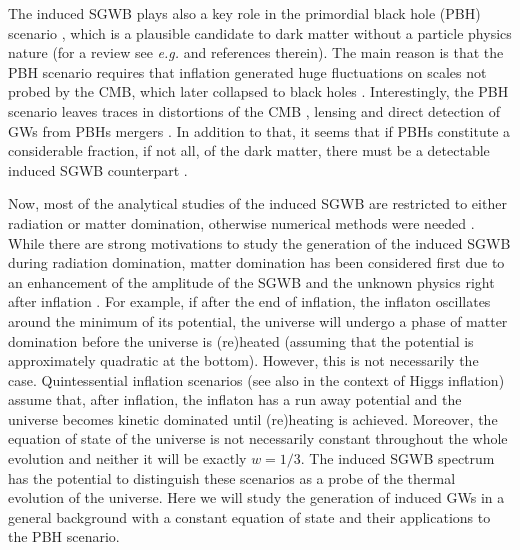\documentclass[aps,10pt,prd,groupedaddress,nofootinbib,notitlepage,eqsecnum,preprintnumbers]{revtex4-1}
\begin{document}
The induced SGWB plays also a key role in the primordial black hole (PBH) scenario \cite{Sasaki:2016jop,Bird:2016dcv,Carr:2016drx,Garcia-Bellido:2017fdg}, which is a plausible candidate to dark matter without a particle physics nature (for a review see \textit{e.g.} \cite{Sasaki:2018dmp} and references therein). The main reason is that the PBH scenario requires that inflation generated huge fluctuations on scales not probed by the CMB, which later collapsed to black holes \cite{Sasaki:2018dmp}. Interestingly, the PBH scenario leaves traces in distortions of the CMB \cite{Nakama:2017xvq}, lensing \cite{Niikura:2017zjd,Zumalacarregui:2017qqd} and direct detection of GWs from PBHs mergers \cite{Sasaki:2016jop,Bird:2016dcv,Gow:2019pok}. In addition to that, it seems that if PBHs constitute a considerable fraction, if not all, of the dark matter, there must be a detectable induced SGWB counterpart \cite{Bugaev:2009zh,Saito:2009jt,Alabidi:2013wtp,Kohri:2018awv,Cai:2018dig,Bartolo:2018rku,Inomata:2018epa,Inomata:2019zqy,Inomata:2019ivs,Yuan:2019udt}.

Now, most of the analytical studies of the induced SGWB are restricted to either radiation or matter domination, otherwise numerical methods were needed \cite{Tomikawa:2019tvi}. While there are strong motivations to study the generation of the induced SGWB during radiation domination, matter domination has been considered first due to an enhancement of the amplitude of the SGWB and the unknown physics right after inflation \cite{Baumann:2007zm,Assadullahi:2009nf,Alabidi:2013wtp}. For example, if after the end of inflation, the inflaton oscillates around the minimum of its potential, the universe will undergo a phase of matter domination before the universe is (re)heated (assuming that the potential is approximately quadratic at the bottom). However, this is not necessarily the case. Quintessential inflation scenarios \cite{Wetterich:1987fm,Spokoiny:1993kt,Wetterich:1994bg,Peebles:1998qn,Brax:2005uf,Wetterich:2014gaa,Hossain:2014zma,Hossain:2014xha,Karananas:2016kyt,Agarwal:2017wxo,Geng:2017mic,Dimopoulos:2017zvq,Rubio:2017gty,Haro:2018zdb} (see also \cite{GarciaBellido:2011de,Casas:2017wjh} in the context of Higgs inflation) assume that, after inflation, the inflaton has a run away potential and the universe becomes kinetic dominated until (re)heating is achieved. Moreover, the equation of state of the universe is not necessarily constant throughout the whole evolution \cite{Byrnes:2018clq,Hajkarim:2019nbx} and neither it will be exactly $w=1/3$. The induced SGWB spectrum has the potential to distinguish these scenarios as a probe of the thermal evolution of the universe. Here we will study the generation of induced GWs in a general background with a constant equation of state and their applications to the PBH scenario.
\end{document}
